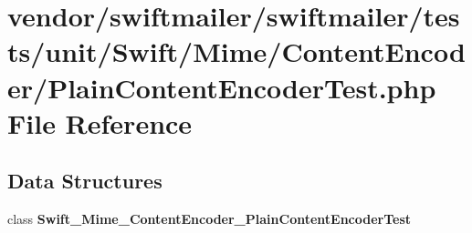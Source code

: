 \section{vendor/swiftmailer/swiftmailer/tests/unit/\+Swift/\+Mime/\+Content\+Encoder/\+Plain\+Content\+Encoder\+Test.php File Reference}
\label{_plain_content_encoder_test_8php}
\subsection*{Data Structures}
\begin{DoxyCompactItemize}
\item 
class {\bf Swift\+\_\+\+Mime\+\_\+\+Content\+Encoder\+\_\+\+Plain\+Content\+Encoder\+Test}
\end{DoxyCompactItemize}
